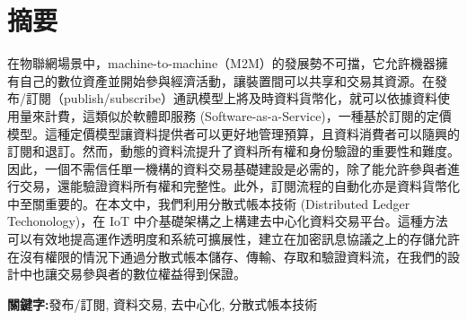 \begin{center}
\vspace{0.5cm}


\end{center}
\restoregeometry
\clearpage
{}

\newpage
{}
\thispagestyle{empty}

\clearpage

\clearpage

\setcounter{page}{1}
\newpage
{}
\chapter*{摘要}
\pagestyle{plain}

\begin{spacing}{2.0}

在物聯網場景中，machine-to-machine（M2M）的發展勢不可擋，它允許機器擁有自己的數位資產並開始參與經濟活動，讓裝置間可以共享和交易其資源。在發布/訂閱（publish/subscribe）通訊模型上將及時資料貨幣化，就可以依據資料使用量來計費，這類似於軟體即服務 (Software-as-a-Service)，一種基於訂閱的定價模型。這種定價模型讓資料提供者可以更好地管理預算，且資料消費者可以隨興的訂閱和退訂。然而，動態的資料流提升了資料所有權和身份驗證的重要性和難度。因此，一個不需信任單一機構的資料交易基礎建設是必需的，除了能允許參與者進行交易，還能驗證資料所有權和完整性。此外，訂閱流程的自動化亦是資料貨幣化中至關重要的。在本文中，我們利用分散式帳本技術 (Distributed Ledger Techonology)，在 IoT 中介基礎架構之上構建去中心化資料交易平台。這種方法可以有效地提高運作透明度和系統可擴展性，建立在加密訊息協議之上的存儲允許在沒有權限的情況下通過分散式帳本儲存、傳輸、存取和驗證資料流，在我們的設計中也讓交易參與者的數位權益得到保證。

\end{spacing}

\par{\noindent \bf 關鍵字:}{發布/訂閱, 資料交易, 去中心化, 分散式帳本技術}
\clearpage
{}

